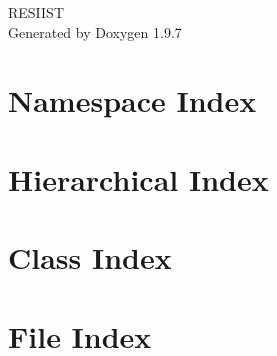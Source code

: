 \documentclass[twoside]{book}
\newcommand{\+}{\discretionary{\mbox{\scriptsize$\hookleftarrow$}}{}{}}
\newcommand{\clearemptydoublepage}{%
    \newpage{\pagestyle{empty}\cleardoublepage}%
  }
\begin{document}
  \raggedbottom
    \hypersetup{pageanchor=false,
                bookmarksnumbered=true,
                pdfencoding=unicode
               }
  \begin{titlepage}
  \vspace*{7cm}
  \begin{center}%
  {\Large RESIIST}\\
  \vspace*{1cm}
  {\large Generated by Doxygen 1.9.7}\\
  \end{center}
  \end{titlepage}
  \clearemptydoublepage
  \tableofcontents
  \clearemptydoublepage
  \hypersetup{pageanchor=true}

\chapter{Namespace Index}

\chapter{Hierarchical Index}

\chapter{Class Index}

\chapter{File Index}

\end{document}
